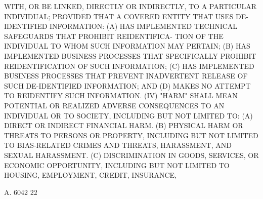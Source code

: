  WITH,  OR BE LINKED, DIRECTLY OR INDIRECTLY, TO A PARTICULAR INDIVIDUAL;
 PROVIDED THAT A COVERED ENTITY THAT USES DE-IDENTIFIED INFORMATION:
   (A) HAS IMPLEMENTED TECHNICAL SAFEGUARDS THAT  PROHIBIT  REIDENTIFICA-
 TION OF THE INDIVIDUAL TO WHOM SUCH INFORMATION MAY PERTAIN;
   (B)  HAS  IMPLEMENTED  BUSINESS  PROCESSES  THAT SPECIFICALLY PROHIBIT
 REIDENTIFICATION OF SUCH INFORMATION;
   (C)  HAS  IMPLEMENTED  BUSINESS  PROCESSES  THAT  PREVENT  INADVERTENT
 RELEASE OF SUCH DE-IDENTIFIED INFORMATION; AND
   (D) MAKES NO ATTEMPT TO REIDENTIFY SUCH INFORMATION.
   (IV)  "HARM"  SHALL MEAN POTENTIAL OR REALIZED ADVERSE CONSEQUENCES TO
 AN INDIVIDUAL OR TO SOCIETY, INCLUDING BUT NOT LIMITED TO:
   (A) DIRECT OR INDIRECT FINANCIAL HARM.
   (B) PHYSICAL HARM OR THREATS TO PERSONS OR PROPERTY, INCLUDING BUT NOT
 LIMITED TO BIAS-RELATED  CRIMES  AND  THREATS,  HARASSMENT,  AND  SEXUAL
 HARASSMENT.
   (C)  DISCRIMINATION  IN  GOODS,  SERVICES,  OR  ECONOMIC  OPPORTUNITY,
 INCLUDING BUT NOT LIMITED TO  HOUSING,  EMPLOYMENT,  CREDIT,  INSURANCE,

 A. 6042                            22
 
